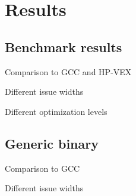 \chapter{Results}

\section{Benchmark results}
Comparison to GCC and HP-VEX

Different issue widths

Different optimization levels

\section{Generic binary}
Comparison to GCC

Different issue widths
\acresetall

